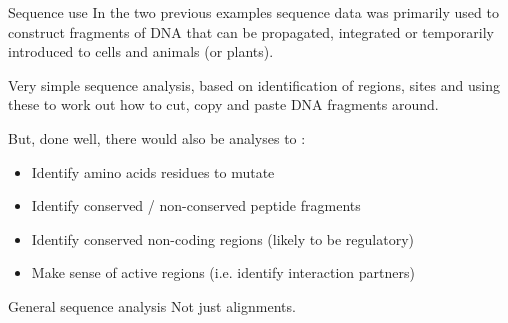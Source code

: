 \documentclass[pdf]{beamer}
\begin{document}
\begin{frame}{Sequence use}
  In the two previous examples sequence data was primarily used to construct
  fragments of DNA that can be propagated, integrated or temporarily
  introduced to cells and animals (or plants).

  Very simple sequence analysis, based on identification of regions, sites and
  using these to work out how to cut, copy and paste DNA fragments around.

  But, done well, there would also be analyses to :
  \begin{itemize}
  \item Identify amino acids residues to mutate
  \item Identify conserved / non-conserved peptide fragments
  \item Identify conserved non-coding regions (likely to be regulatory)
  \item Make sense of active regions (i.e. identify interaction partners)
  \end{itemize}
  
\end{frame}

\begin{frame}{General sequence analysis}
  Not just alignments.
  \begin{figure}[ht]
  \end{figure}
  \small
\end{frame}
\end{document}
